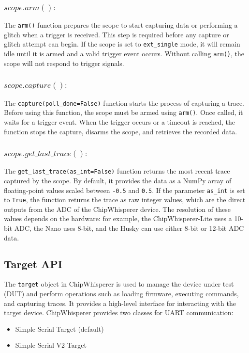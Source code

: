 \subsubsection{$scope.arm() :$}
The \texttt{arm()} function prepares the scope to start capturing data or performing a glitch when a trigger is received. This step is required before any capture or glitch attempt can begin. If the scope is set to \texttt{ext\_single} mode, it will remain idle until it is armed and a valid trigger event occurs. Without calling \texttt{arm()}, the scope will not respond to trigger signals.

\subsubsection{$scope.capture() :$}
The \texttt{capture(poll\_done=False)} function starts the process of capturing a trace. Before using this function, the scope must be armed using \texttt{arm()}. Once called, it waits for a trigger event. When the trigger occurs or a timeout is reached, the function stops the capture, disarms the scope, and retrieves the recorded data.


\subsubsection{$scope.get\_last\_trace() :$}
The \texttt{get\_last\_trace(as\_int=False)} function returns the most recent trace captured by the scope. By default, it provides the data as a NumPy array of floating-point values scaled between \texttt{-0.5} and \texttt{0.5}. If the parameter \texttt{as\_int} is set to \texttt{True}, the function returns the trace as raw integer values, which are the direct outputs from the ADC of the ChipWhisperer device. The resolution of these values depends on the hardware: for example, the ChipWhisperer-Lite uses a 10-bit ADC, the Nano uses 8-bit, and the Husky can use either 8-bit or 12-bit ADC data.

\subsection{Target API}
The \texttt{target} object in ChipWhisperer is used to manage the device under test (DUT) and perform operations such as loading firmware, executing commands, and capturing traces. It provides a high-level interface for interacting with the target device.
ChipWhisperer provides two classes for UART communication:

\begin{itemize}
    \item Simple Serial Target (default)
    \item Simple Serial V2 Target
\end{itemize}

